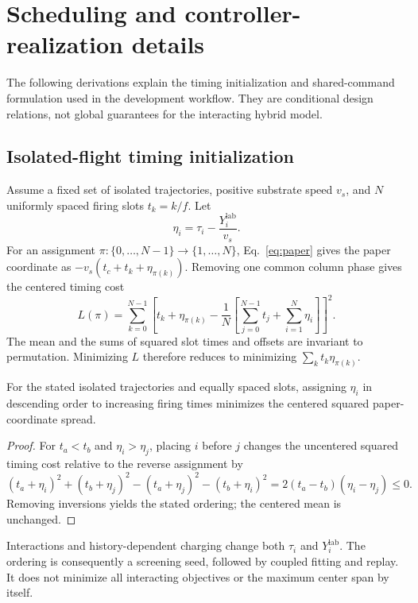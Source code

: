 \section{Scheduling and controller-realization details}
\label{app:analysis}
The following derivations explain the timing initialization and shared-command formulation used in the development workflow. They are conditional design relations, not global guarantees for the interacting hybrid model.

\subsection{Isolated-flight timing initialization}
Assume a fixed set of isolated trajectories, positive substrate speed $v_s$, and $N$ uniformly spaced firing slots $t_k=k/f$. Let
\begin{equation}
 \eta_i=\tau_i-\frac{Y_i^{\mathrm{lab}}}{v_s}.
\end{equation}
For an assignment $\pi:\{0,\ldots,N-1\}\to\{1,\ldots,N\}$, Eq.~\eqref{eq:paper} gives the paper coordinate as $-v_s(t_c+t_k+\eta_{\pi(k)})$. Removing one common column phase gives the centered timing cost
\begin{equation}
 L(\pi)=\sum_{k=0}^{N-1}
 \left[t_k+\eta_{\pi(k)}-
 \frac{1}{N}\left[\sum_{j=0}^{N-1}t_j+\sum_{i=1}^{N}\eta_i\right]\right]^2.
\end{equation}
The mean and the sums of squared slot times and offsets are invariant to permutation. Minimizing $L$ therefore reduces to minimizing $\sum_k t_k\eta_{\pi(k)}$.

\begin{proposition}
For the stated isolated trajectories and equally spaced slots, assigning $\eta_i$ in descending order to increasing firing times minimizes the centered squared paper-coordinate spread.
\end{proposition}
\begin{proof}
For $t_a<t_b$ and $\eta_i>\eta_j$, placing $i$ before $j$ changes the uncentered squared timing cost relative to the reverse assignment by
\begin{equation}
 (t_a+\eta_i)^2+(t_b+\eta_j)^2
 -(t_a+\eta_j)^2-(t_b+\eta_i)^2
 =2(t_a-t_b)(\eta_i-\eta_j)\leq0.
\end{equation}
Removing inversions yields the stated ordering; the centered mean is unchanged.
\end{proof}
Interactions and history-dependent charging change both $\tau_i$ and $Y_i^{\mathrm{lab}}$. The ordering is consequently a screening seed, followed by coupled fitting and replay. It does not minimize all interacting objectives or the maximum center span by itself.

